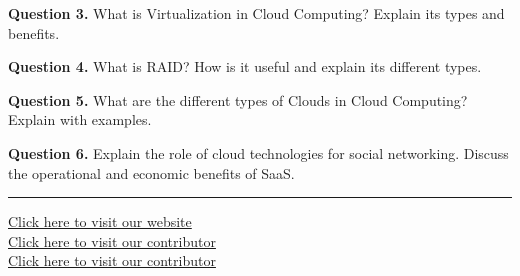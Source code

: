 \documentclass[11pt,a4paper]{article}
\begin{document}
\noindent   \textbf{Question 3.} What is Virtualization in Cloud Computing? Explain its types and benefits.

\medskip



\noindent   \textbf{Question 4.} What is RAID? How is it useful and explain its different types.

\medskip



\noindent   \textbf{Question 5.} What are the different types of Clouds in Cloud Computing? Explain with examples.

\medskip



\noindent   \textbf{Question 6.} Explain the role of cloud technologies for social networking. Discuss the operational and economic benefits of SaaS.

\vfill
\rule{\linewidth}{0.4pt}

\begin{center}\small
\href{https://bhu-exam.vercel.app/}{Click here to visit our website}\\[4pt]\href{https://me-aryan.vercel.app/}{Click here to visit our contributor}\\[4pt]\href{https://quashan-me.vercel.app/}{Click here to visit our contributor}
\end{center}
\end{document}
